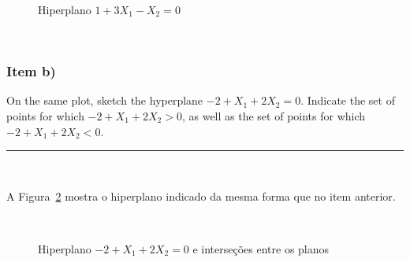 \documentclass[
  a4paperpaper,
]{article}
\begin{document}
\begin{figure}[H]


\caption{\label{fig-q1a}Hiperplano \(1 + 3X_1 - X_2 = 0\)}

\end{figure}%

~

\subsubsection{Item b)}\label{item-b}

On the same plot, sketch the hyperplane \(-2 + X_1 + 2X_2 = 0\).
Indicate the set of points for which \(-2 + X_1 + 2X_2 > 0\), as well as
the set of points for which \(-2 + X_1 + 2X_2 < 0\).

\begin{center}\rule{0.5\linewidth}{0.5pt}\end{center}

~

A Figura~\ref{fig-q1b} mostra o hiperplano indicado da mesma forma que
no item anterior.

~

\begin{figure}[H]


\caption{\label{fig-q1b}Hiperplano \(-2 + X_1 + 2X_2 = 0\) e interseções
entre os planos}

\end{figure}%
\end{document}
